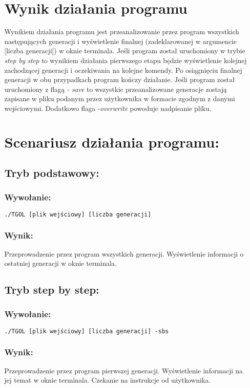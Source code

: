 \documentclass[11pt,a4paper]{report}
\begin{document}
\section{Wynik działania programu}\label{sec:teskt}
Wynikiem działania programu jest przeanalizowanie przez program wszystkich następujących generacji i wyświetlenie finalnej (zadeklarowanej w argumencie [liczba generacji]) w oknie terminala.
Jeśli program został uruchomiony w trybie \textsl {step by step} to wynikiem działania pierwszego etapu będzie wyświetlenie kolejnej zachodzącej generacji i oczekiwania na kolejne komendy.
Po osiągnięciu finalnej generacji w obu przypadkach program kończy działanie. Jeśli program został uruchomiony z flagą \textsl{- save} to wszystkie przeanalizowane generacje zostają zapisane w pliku podanym przez użytkownika w formacie zgodnym z danymi wejściowymi. Dodatkowo flaga \textsl{-overwrite} powoduje nadpisanie pliku. 

\section{Scenariusz działania programu:}\label{sec:teskt}
\subsection {Tryb podstawowy:}
\subsubsection {Wywołanie:}
		\texttt{./TGOL [plik wejściowy] [liczba generacji]} \\
\subsubsection {Wynik:}
		Przeprowadzenie przez program wszystkich generacji. Wyświetlenie informacji o ostatniej generacji w oknie terminala.

\subsection {Tryb step by step:}
\subsubsection {Wywołanie:}
		\texttt{./TGOL [plik wejściowy] [liczba generacji] -sbs}
\subsubsection {Wynik:}
		Przeprowadzenie przez program pierwszej generacji. Wyświetlenie informacji na jej temat w oknie terminala. Czekanie na instrukcje od użytkownika.
\end{document}
